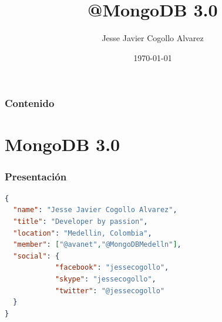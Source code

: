 \documentclass{beamer}
\title[@MongoDB]{@MongoDB 3.0} %
\author{Jesse Javier Cogollo Alvarez} %
\institute[SENA] %
{
Developer by passion \\ %
\medskip
\textit{email: cogollo87@gmail.com} %
}
\date{\today} %
\begin{document}
\begin{frame}
\titlepage %
\end{frame}

\begin{frame}
\frametitle{Contenido} %
\tableofcontents %
\end{frame}


\section{MongoDB 3.0} %

\begin{frame}[fragile] %
\frametitle{Presentaci\'on}
\begin{example}[yo]

\begin{lstlisting}[language=json,firstnumber=1]
{
  "name": "Jesse Javier Cogollo Alvarez",
  "title": "Developer by passion",
  "location": "Medellin, Colombia",
  "member": ["@avanet","@MongoDBMedelln"],
  "social": {
    		"facebook": "jessecogollo", 
    		"skype": "jessecogollo", 
    		"twitter": "@jessecogollo"
  }
}
\end{lstlisting}

\end{example}
\end{frame}
\end{document}
